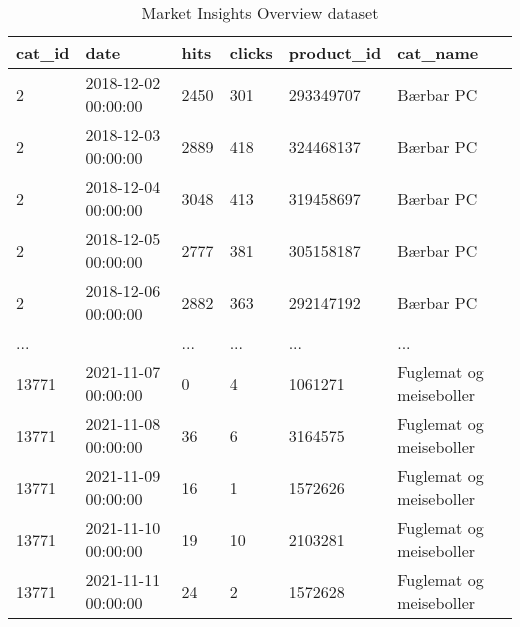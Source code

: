 \begin{table}[htbp]
\centering
\caption{Market Insights Overview dataset}
\label{table:market_insights_overview_11-12-21}
\begin{tabular}{llllll}
\toprule
cat\_id &                date & hits & clicks & product\_id &                cat\_name \\
\midrule
     2 & 2018-12-02 00:00:00 & 2450 &    301 &  293349707 &               Bærbar PC \\
     2 & 2018-12-03 00:00:00 & 2889 &    418 &  324468137 &               Bærbar PC \\
     2 & 2018-12-04 00:00:00 & 3048 &    413 &  319458697 &               Bærbar PC \\
     2 & 2018-12-05 00:00:00 & 2777 &    381 &  305158187 &               Bærbar PC \\
     2 & 2018-12-06 00:00:00 & 2882 &    363 &  292147192 &               Bærbar PC \\
   ... &                     &  ... &    ... &        ... &                     ... \\
 13771 & 2021-11-07 00:00:00 &    0 &      4 &    1061271 & Fuglemat og meiseboller \\
 13771 & 2021-11-08 00:00:00 &   36 &      6 &    3164575 & Fuglemat og meiseboller \\
 13771 & 2021-11-09 00:00:00 &   16 &      1 &    1572626 & Fuglemat og meiseboller \\
 13771 & 2021-11-10 00:00:00 &   19 &     10 &    2103281 & Fuglemat og meiseboller \\
 13771 & 2021-11-11 00:00:00 &   24 &      2 &    1572628 & Fuglemat og meiseboller \\
\bottomrule
\end{tabular}
\end{table}
